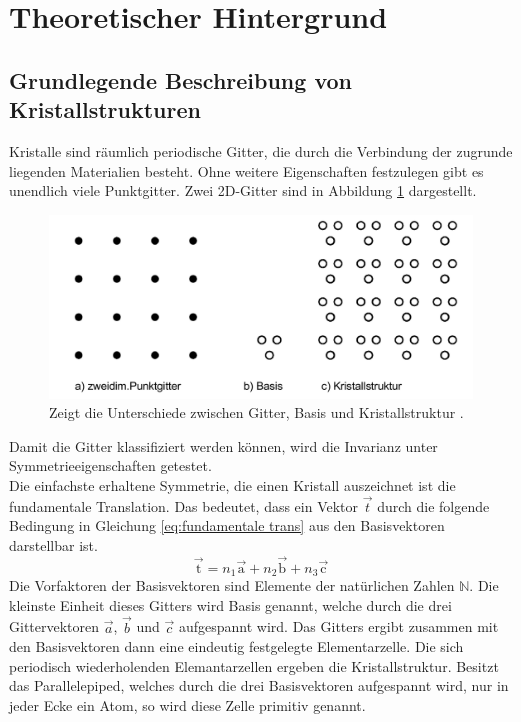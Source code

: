 ﻿\section{Theoretischer Hintergrund}
\label{sec:Theorie}
\subsection{Grundlegende Beschreibung von Kristallstrukturen}
Kristalle sind räumlich periodische Gitter, die durch die Verbindung der zugrunde liegenden Materialien besteht. 
Ohne weitere Eigenschaften festzulegen gibt es unendlich viele Punktgitter.
Zwei 2D-Gitter sind in Abbildung \ref{fig:2dgitter} dargestellt.
\begin{figure}
	\centering
	\includegraphics[width = \textwidth]{Abbildungen/2dgitter.png}
	\caption{Zeigt die Unterschiede zwischen Gitter, Basis und Kristallstruktur \cite{Anleitung}.}
	\label{fig:2dgitter}
\end{figure} 
Damit die Gitter klassifiziert werden können, wird die Invarianz unter Symmetrieeigenschaften getestet. \\
Die einfachste erhaltene Symmetrie, die einen Kristall auszeichnet ist die fundamentale Translation. Das bedeutet, dass ein Vektor $\vec{t}$ durch die folgende Bedingung in Gleichung \ref{eq:fundamentale trans} aus den Basisvektoren darstellbar ist.
\begin{equation}
\vec{\text{t}} = n_1 \vec{\text{a}}+n_2 \vec{\text{b}}+n_3 \vec{\text{c}}
\label{eq:fundamentale trans}
\end{equation}
Die Vorfaktoren der Basisvektoren sind Elemente der natürlichen Zahlen $\mathbb{N}$.
Die kleinste Einheit dieses Gitters wird Basis genannt, welche durch die drei Gittervektoren $\vec{a}$, $\vec{b}$ und $\vec{c}$ aufgespannt wird.
Das Gitters ergibt zusammen mit den Basisvektoren dann eine eindeutig festgelegte Elementarzelle.
Die sich periodisch wiederholenden Elemantarzellen ergeben die Kristallstruktur.
Besitzt das Parallelepiped, welches durch die drei Basisvektoren aufgespannt wird, nur in jeder Ecke ein Atom, so wird diese Zelle primitiv genannt.
